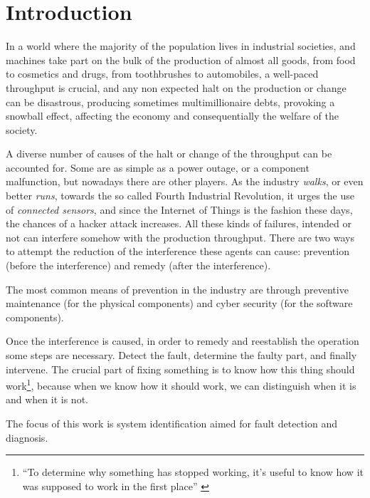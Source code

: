
\chapter{Introduction}
In a world where the majority of the population lives in industrial societies,
and machines take part on the bulk of the production of almost all goods, from
food to cosmetics and drugs, from toothbrushes to automobiles, 
a well-paced throughput is crucial, and any non expected halt on the
production or change can be disastrous, producing sometimes multimillionaire debts,
provoking a snowball effect, affecting the economy and consequentially the welfare of the society.

A diverse number of causes of the halt or change of the throughput can be
accounted for. Some are as simple as a power outage, or a component malfunction,
but nowadays there are other players. As the industry \textsl{walks}, or even
better \textsl{runs}, towards the so called Fourth Industrial Revolution, 
it urges the use of \textit{connected sensors}, and since the Internet of
Things is the fashion these days, the chances of a hacker attack increases. All
these kinds of failures, intended or not can interfere somehow with the
production throughput. There are two ways to attempt the reduction of the interference these agents can
cause: prevention (before the interference) and remedy (after the interference).

The most common means of prevention in the industry are through preventive
maintenance (for the physical components) and cyber security (for the software
components).

Once the interference is caused, in order to remedy and reestablish
the operation some steps are necessary. Detect the fault, determine the faulty
part, and finally intervene.
The crucial part of fixing something is to know how this thing should
work\footnote{``To determine why something has stopped working, it's useful to
  know how it was supposed to work in the first place'' \cite{davis1988model}},
because when we know how it should work, we can distinguish when it is and when
it is not.

The focus of this work is system identification aimed for fault
detection and diagnosis.



